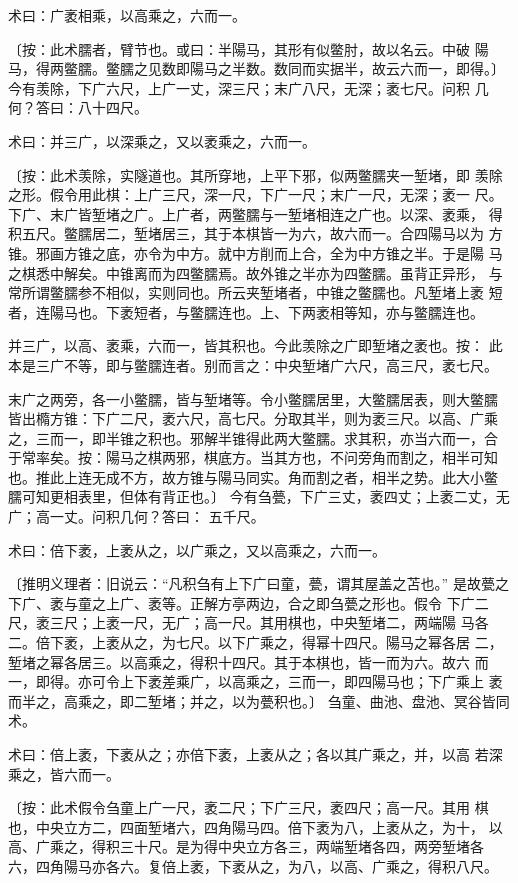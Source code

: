\documentclass[a4paper,12pt,UTF8,twoside]{ctexbook}
\begin{document}
术曰：广袤相乘，以高乘之，六而一。

〔按：此术臑者，臂节也。或曰：半陽马，其形有似鳖肘，故以名云。中破 陽马，得两鳖臑。鳖臑之见数即陽马之半数。数同而实据半，故云六而一，即得。〕 今有羡除，下广六尺，上广一丈，深三尺；末广八尺，无深；袤七尺。问积 几何？答曰：八十四尺。

术曰：并三广，以深乘之，又以袤乘之，六而一。

〔按：此术羡除，实隧道也。其所穿地，上平下邪，似两鳖臑夹一堑堵，即 羡除之形。假令用此棋：上广三尺，深一尺，下广一尺；末广一尺，无深；袤一 尺。下广、末广皆堑堵之广。上广者，两鳖臑与一堑堵相连之广也。以深、袤乘， 得积五尺。鳖臑居二，堑堵居三，其于本棋皆一为六，故六而一。合四陽马以为 方锥。邪画方锥之底，亦令为中方。就中方削而上合，全为中方锥之半。于是陽 马之棋悉中解矣。中锥离而为四鳖臑焉。故外锥之半亦为四鳖臑。虽背正异形， 与常所谓鳖臑参不相似，实则同也。所云夹堑堵者，中锥之鳖臑也。凡堑堵上袤 短者，连陽马也。下袤短者，与鳖臑连也。上、下两袤相等知，亦与鳖臑连也。

并三广，以高、袤乘，六而一，皆其积也。今此羡除之广即堑堵之袤也。按： 此本是三广不等，即与鳖臑连者。别而言之：中央堑堵广六尺，高三尺，袤七尺。

末广之两旁，各一小鳖臑，皆与堑堵等。令小鳖臑居里，大鳖臑居表，则大鳖臑 皆出橢方锥：下广二尺，袤六尺，高七尺。分取其半，则为袤三尺。以高、广乘 之，三而一，即半锥之积也。邪解半锥得此两大鳖臑。求其积，亦当六而一，合 于常率矣。按：陽马之棋两邪，棋底方。当其方也，不问旁角而割之，相半可知 也。推此上连无成不方，故方锥与陽马同实。角而割之者，相半之势。此大小鳖 臑可知更相表里，但体有背正也。〕 今有刍甍，下广三丈，袤四丈；上袤二丈，无广；高一丈。问积几何？答曰： 五千尺。

术曰：倍下袤，上袤从之，以广乘之，又以高乘之，六而一。

〔推明义理者：旧说云：“凡积刍有上下广曰童，甍，谓其屋盖之苫也。” 是故甍之下广、袤与童之上广、袤等。正解方亭两边，合之即刍甍之形也。假令 下广二尺，袤三尺；上袤一尺，无广；高一尺。其用棋也，中央堑堵二，两端陽 马各二。倍下袤，上袤从之，为七尺。以下广乘之，得幂十四尺。陽马之幂各居 二，堑堵之幂各居三。以高乘之，得积十四尺。其于本棋也，皆一而为六。故六 而一，即得。亦可令上下袤差乘广，以高乘之，三而一，即四陽马也；下广乘上 袤而半之，高乘之，即二堑堵；并之，以为甍积也。〕 刍童、曲池、盘池、冥谷皆同术。

术曰：倍上袤，下袤从之；亦倍下袤，上袤从之；各以其广乘之，并，以高 若深乘之，皆六而一。

〔按：此术假令刍童上广一尺，袤二尺；下广三尺，袤四尺；高一尺。其用 棋也，中央立方二，四面堑堵六，四角陽马四。倍下袤为八，上袤从之，为十， 以高、广乘之，得积三十尺。是为得中央立方各三，两端堑堵各四，两旁堑堵各 六，四角陽马亦各六。复倍上袤，下袤从之，为八，以高、广乘之，得积八尺。
\end{document}
